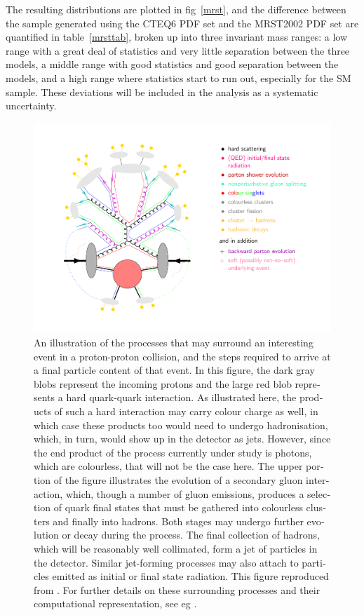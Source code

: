\begin{english}
The resulting distributions are plotted in fig~\ref{mrst}, and the difference between the sample generated using the CTEQ6 PDF set and the MRST2002 PDF set are quantified in table~\ref{mrsttab}, broken up into three invariant mass ranges: a low range with a great deal of statistics and very little separation between the three models, a middle range with good statistics and good separation between the models, and a high range where statistics start to run out, especially for the SM sample. These deviations will be included in the analysis as a systematic uncertainty.

\begin{figure}[htb]
\includegraphics[width=\textwidth]{figures/Zep-soft}
\caption{An illustration of the processes that may surround an interesting event in a proton-proton collision, and the steps required to arrive at a final particle content of that event. In this figure, the dark gray blobs represent the incoming protons and the large red blob represents a hard quark-quark interaction. As illustrated here, the products of such a hard interaction may carry colour charge as well, in which case these products too would need to undergo hadronisation, which, in turn, would show up in the detector as jets. However, since the end product of the process currently under study is photons, which are colourless, that will not be the case here. The upper portion of the figure illustrates the evolution of a secondary gluon interaction, which, though a number of gluon emissions, produces a selection of quark final states that must be gathered into colourless clusters and finally into hadrons. Both stages may undergo further evolution or decay during the process. The final collection of hadrons, which will be reasonably well collimated, form a jet of particles in the detector. Similar jet-forming processes may also attach to particles emitted as initial or final state radiation. This figure reproduced from \cite{zep}. For further details on these surrounding processes and their computational representation, see eg \cite{pythman}.
\label{zep}}
\end{figure}


\end{english}

